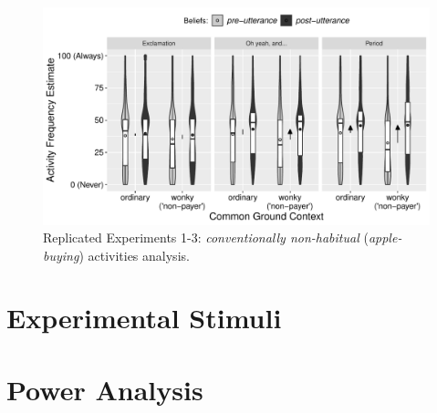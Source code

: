\documentclass{sp}\usepackage[]{graphicx}\usepackage[]{color}
\makeatletter
\def\maxwidth{ %
  \ifdim\Gin@nat@width>\linewidth
    \linewidth
  \else
    \Gin@nat@width
  \fi
}
\newenvironment{knitrout}{}{} %
\makeatother
\begin{document}
\begin{figure}\begin{center}
\begin{knitrout}
\color{fgcolor}
\includegraphics[width=\maxwidth]{figure/suppfig2-1} 

\end{knitrout}
\end{center}
\caption{Replicated Experiments 1-3: \textit{conventionally non-habitual} (\textit{apple-buying}) activities analysis.}
\label{fig:oldexpallopt}
\end{figure}

\pagebreak

\section{Experimental Stimuli}\label{stimuli}



\pagebreak

\section{Power Analysis}\label{power}
\end{document}
